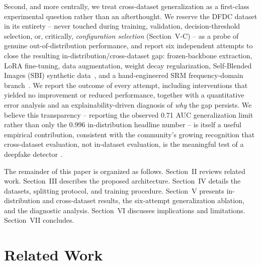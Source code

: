 \documentclass[conference]{IEEEtran}
\begin{document}
Second, and more centrally, we treat cross-dataset generalization as a
first-class experimental question rather than an afterthought. We reserve
the DFDC dataset \cite{dolhansky2020dfdc} in its entirety -- never touched
during training, validation, decision-threshold selection, or, critically,
\emph{configuration selection} (Section~V-C) -- as a probe of genuine
out-of-distribution performance, and report six independent
attempts to close the resulting in-distribution/cross-dataset gap:
frozen-backbone extraction, LoRA fine-tuning, data augmentation, weight
decay regularization, Self-Blended Images (SBI) synthetic
data~\cite{shiohara2022sbi}, and a hand-engineered SRM frequency-domain
branch~\cite{fridrich2012srm}. We report the outcome of every attempt,
including interventions that yielded no improvement or reduced
performance, together with a
quantitative error analysis and an explainability-driven diagnosis of
\emph{why} the gap persists. We believe this transparency -- reporting the
observed 0.71 AUC generalization limit rather than only the 0.996
in-distribution headline number -- is itself a useful empirical
contribution, consistent
with the community's growing recognition that cross-dataset evaluation, not
in-dataset evaluation, is the meaningful test of a deepfake detector
\cite{tolosana2020survey, haliassos2021lipforensics, cao2022recce}.

The remainder of this paper is organized as follows. Section~II reviews
related work. Section~III describes the proposed architecture. Section~IV
details the datasets, splitting protocol, and training procedure. Section~V
presents in-distribution and cross-dataset results, the six-attempt
generalization ablation, and the diagnostic analysis. Section~VI discusses
implications and limitations. Section~VII concludes.

\section{Related Work}
\end{document}
